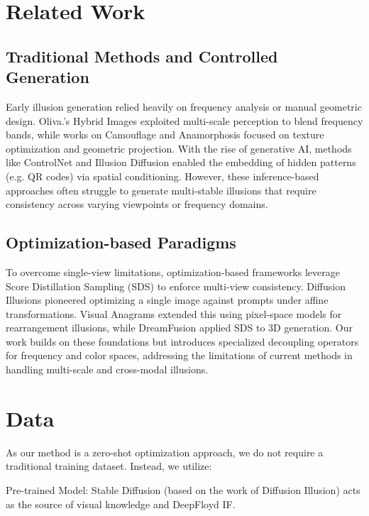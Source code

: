 \documentclass{article}
\begin{document}
\section{Related Work}
\label{related_work}

\subsection{Traditional Methods and Controlled Generation}

Early illusion generation relied heavily on frequency analysis or manual geometric design. Oliva\cite{10.1145/1141911.1141919}.'s Hybrid Images exploited multi-scale perception to blend frequency bands, while works on Camouflage and Anamorphosis \cite{chu2010camouflage} focused on texture optimization and geometric projection. With the rise of generative AI, methods like ControlNet\cite{zhao2023uni} and Illusion Diffusion\cite{10.1145/3641519.3657500} enabled the embedding of hidden patterns (e.g. QR codes) via spatial conditioning. However, these inference-based approaches often struggle to generate multi-stable illusions that require consistency across varying viewpoints or frequency domains.

\subsection{Optimization-based Paradigms}

To overcome single-view limitations, optimization-based frameworks leverage Score Distillation Sampling (SDS) to enforce multi-view consistency. Diffusion Illusions\cite{10.1145/3641519.3657500} pioneered optimizing a single image against prompts under affine transformations. Visual Anagrams\cite{geng2024visual} extended this using pixel-space models for rearrangement illusions, while DreamFusion\cite{poole2022dreamfusion} applied SDS to 3D generation. Our work builds on these foundations but introduces specialized decoupling operators for frequency and color spaces, addressing the limitations of current methods in handling multi-scale and cross-modal illusions.

\section{Data}
\label{data}


As our method is a zero-shot optimization approach, we do not require a traditional training dataset. Instead, we utilize:

Pre-trained Model: Stable Diffusion (based on the work of Diffusion Illusion\cite{10.1145/3641519.3657500}) acts as the source of visual knowledge and DeepFloyd IF.
\end{document}
